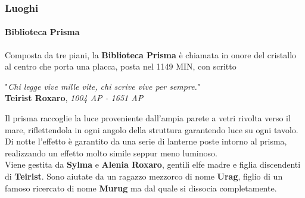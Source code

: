 \documentclass[10pt,twoside,onecolumn,openany]{book}
\begin{document}
\subsubsection{Luoghi}
\paragraph{Biblioteca Prisma}
Composta da tre piani, la \textbf{Biblioteca Prisma} è chiamata in onore del cristallo al centro che porta una placca, posta nel 1149 MIN, con scritto \begin{center}
"\textit{Chi legge vive mille vite, chi scrive vive per sempre.}"\\
\textbf{Teirist Roxaro}, \textit{1004 AP - 1651 AP}
\end{center}
Il prisma raccoglie la luce proveniente dall'ampia parete a vetri rivolta verso il mare, riflettendola in ogni angolo della struttura garantendo luce su ogni tavolo. Di notte l'effetto è garantito da una serie di lanterne poste intorno al prisma, realizzando un effetto molto simile seppur meno luminoso.\\
Viene gestita da \textbf{Sylma} e \textbf{Alenia Roxaro}, gentili elfe madre e figlia discendenti di \textbf{Teirist}. Sono aiutate da un ragazzo mezzorco di nome \textbf{Urag}, figlio di un famoso ricercato di nome \textbf{Murug} ma dal quale si dissocia completamente.
\end{document}
